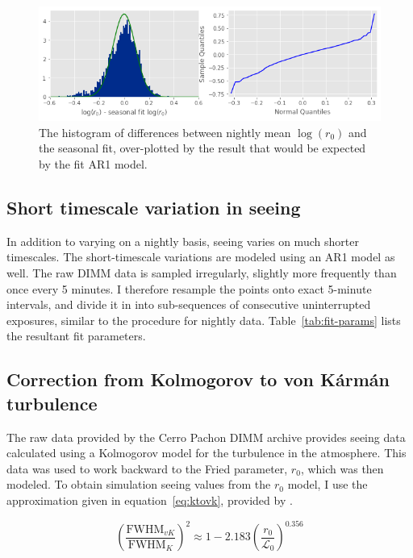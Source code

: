\documentclass[DM,authoryear,toc]{lsstdoc}
\begin{document}
\begin{figure}
  \includegraphics[width=\columnwidth]{./figures/night_ar1_dist.png}
  \caption{The histogram of differences between nightly mean
    $\log(r_0)$ and the seasonal fit, over-plotted by the result that
    would be expected by the fit AR1 model.}
  \label{fig:night-ar1-dist}
\end{figure}

\subsection{Short timescale variation in seeing}
\label{sec:short-variation}

In addition to varying on a nightly basis, seeing varies on much
shorter timescales. The short-timescale variations are modeled using
an AR1 model as well. The raw DIMM data is sampled irregularly,
slightly more frequently than once every 5 minutes. I therefore
resample the points onto exact 5-minute intervals, and divide it in into
sub-sequences of consecutive uninterrupted exposures, similar to the
procedure for nightly data. Table~\ref{tab:fit-params} lists the
resultant fit parameters.

\subsection{Correction from Kolmogorov to von K\'arm\'an turbulence}
\label{sec:vkcorr}

The raw data provided by the Cerro Pachon DIMM archive provides seeing
data calculated using a Kolmogorov model for the turbulence in the
atmosphere. This data was used to work backward to the Fried
parameter, $r_0$, which was then modeled. To obtain simulation seeing
values from the $r_0$ model, I use the approximation given in
equation~\ref{eq:ktovk}, provided by \cite{2002PASP..114.1156T}.

\begin{equation} \label{eq:ktovk}
\left( \frac{\mbox{FWHM}_{vK}}{\mbox{FWHM}_{K}} \right)^2
\approx 1 - 2.183 \left( \frac{r_0}{\mathcal{L}_0} \right)^{0.356}
\end{equation}
\end{document}
